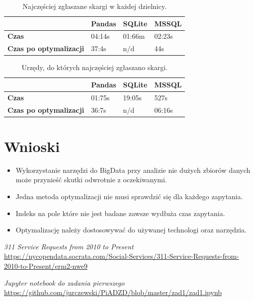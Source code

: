 \documentclass{classrep}
\begin{document}
\begin{table}[H]
\centering
\caption{Najczęściej zgłaszane skargi w każdej dzielnicy.}
\label{tab:calc3}
\begin{tabular}{|l|l|l|l|}
\hline
 & \textbf{Pandas} & \textbf{SQLite} & \textbf{MSSQL} \\ \hline
\textbf{Czas} & 04:14s & 01:66m & 02:23s \\ \hline
\textbf{Czas po optymalizacji} & 37:4s & n/d & 44s \\ \hline
\end{tabular}
\end{table}

\begin{table}[H]
\centering
\caption{Urzędy, do których najczęściej zgłaszano skargi.}
\label{tab:calc4}
\begin{tabular}{|l|l|l|l|}
\hline
 & \textbf{Pandas} & \textbf{SQLite} & \textbf{MSSQL} \\ \hline
\textbf{Czas} & 01:75s & 19:05s & 527s \\ \hline
\textbf{Czas po optymalizacji} & 36:7s & n/d & 06:16s \\ \hline
\end{tabular}
\end{table}

\section{Wnioski}

\begin{itemize}
    \item Wykorzystanie narzędzi do BigData przy analizie nie dużych zbiorów danych może przynieść skutki odwrotnie z oczekiwanymi.
    \item Jedna metoda optymalizacji nie musi sprawdzić się dla każdego zapytania.
    \item Indeks na pole które nie jest badane zawsze wydłuża czas zapytania.
    \item Optymalizację należy dostosowywać do używanej technologi oraz narzędzia.

\end{itemize}


\nocite{*}
\begin{thebibliography}{0}
    \textsl{311 Service Requests from 2010 to Present}
    \url{https://nycopendata.socrata.com/Social-Services/311-Service-Requests-from-2010-to-Present/erm2-nwe9}
    
    \textsl{Jupyter notebook do zadania pierwszego}
    \url{https://github.com/jurczewski/PiADZD/blob/master/zad1/zad1.ipynb}

    
\end{thebibliography}
\end{document}
